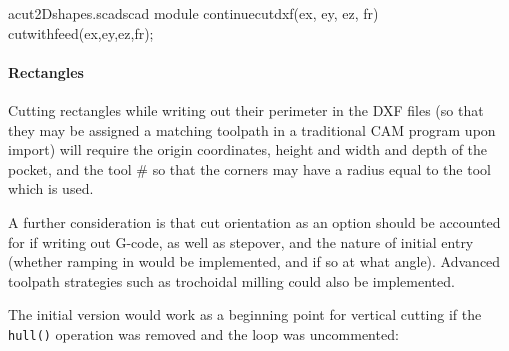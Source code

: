 \documentclass{ltxdoc}
\begin{document}
\lstset{firstnumber=\thecuttwod}
\begin{writecode}{a}{cut2Dshapes.scad}{scad}
module continuecutdxf(ex, ey, ez, fr) {
  cutwithfeed(ex,ey,ez,fr);
}

\end{writecode}
\addtocounter{cuttwod}{4}

\paragraph{Rectangles}

Cutting rectangles while writing out their perimeter in the DXF files (so that they may
be assigned a matching toolpath in a traditional CAM program upon import) will require
the origin coordinates, height and width and depth of the pocket, and the tool \# so
that the corners may have a radius equal to the tool which is used.

A further consideration is that cut orientation as an option should be accounted for
if writing out G-code, as well as stepover, and the nature of initial
entry (whether ramping in would be implemented, and if so at what angle). Advanced 
toolpath strategies such as trochoidal milling could also be implemented.

%
The initial version would work as a beginning point for vertical cutting if the \texttt{hull()}
operation was removed and the loop was uncommented:
 
\end{document}
